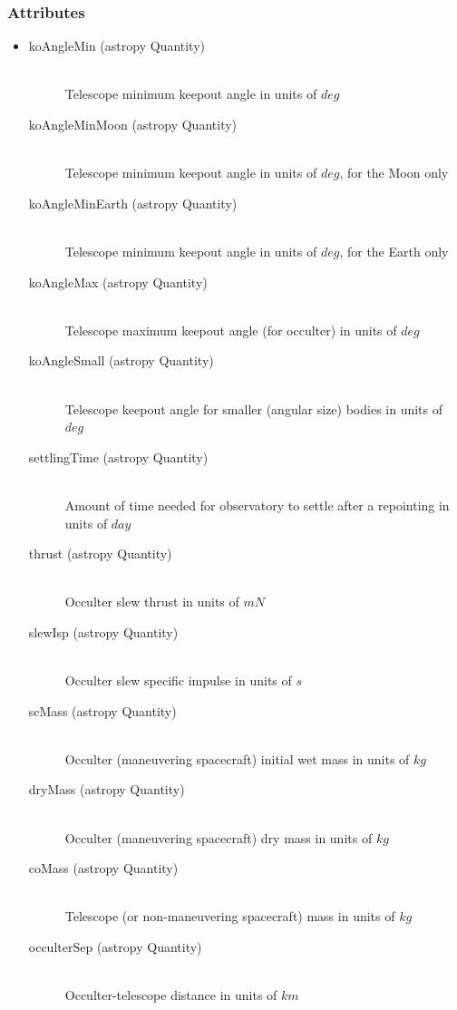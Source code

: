 \documentclass[cleanfoot]{asme2ej}
\begin{document}
\subsubsection*{Attributes}
\begin{itemize}
\item
\begin{description}
    \item[koAngleMin (astropy Quantity)] \hfill \\ Telescope minimum keepout angle in units of $deg$
    \item[koAngleMinMoon (astropy Quantity)] \hfill \\ Telescope minimum keepout angle in units of $deg$, for the Moon only
    \item[koAngleMinEarth (astropy Quantity)] \hfill \\ Telescope minimum keepout angle in units of $deg$, for the Earth only
    \item[koAngleMax (astropy Quantity)] \hfill \\ Telescope maximum keepout angle (for occulter) in units of $deg$
    \item[koAngleSmall (astropy Quantity)] \hfill \\ Telescope keepout angle for smaller (angular size) bodies in units of $deg$
    \item[settlingTime (astropy Quantity)] \hfill \\ Amount of time needed for observatory to settle after a repointing in units of $ day $
    \item[thrust (astropy Quantity)] \hfill \\ Occulter slew thrust in units of $ mN $
    \item[slewIsp (astropy Quantity)] \hfill \\ Occulter slew specific impulse in units of $ s $
    \item[scMass (astropy Quantity)] \hfill \\ Occulter (maneuvering spacecraft) initial wet mass in units of $ kg $
    \item[dryMass (astropy Quantity)] \hfill \\ Occulter (maneuvering spacecraft) dry mass in units of $ kg $
    \item[coMass (astropy Quantity)] \hfill \\ Telescope (or non-maneuvering spacecraft) mass in units of $ kg $
    \item[occulterSep (astropy Quantity)] \hfill \\ Occulter-telescope distance in units of $ km $

\end{description}
\end{itemize}
\end{document}

